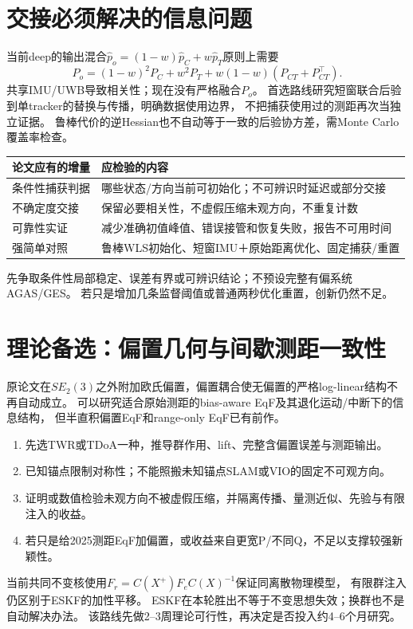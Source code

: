 \documentclass[11pt,a4paper]{ctexart}
\begin{document}
\clearpage
\section{交接必须解决的信息问题}
当前deep的输出混合$\hat p_o=(1-w)\hat p_C+w\hat p_T$原则上需要
\begin{equation}
P_o=(1-w)^2P_C+w^2P_T+w(1-w)(P_{CT}+P_{CT}^{\top}).
\end{equation}
共享IMU/UWB导致相关性；现在没有严格融合$P_o$。
首选路线研究短窗联合后验到单tracker的替换与传播，明确数据使用边界，
不把捕获使用过的测距再次当独立证据。
鲁棒代价的逆Hessian也不自动等于一致的后验协方差，需Monte Carlo覆盖率检查。

\begin{center}\small
\begin{tabularx}{\linewidth}{lX}
\toprule
论文应有的增量&应检验的内容\\\midrule
条件性捕获判据&哪些状态/方向当前可初始化；不可辨识时延迟或部分交接\\
不确定度交接&保留必要相关性，不虚假压缩未观方向，不重复计数\\
可靠性实证&减少准确初值峰值、错误接管和恢复失败，报告不可用时间\\
强简单对照&鲁棒WLS初始化、短窗IMU＋原始距离优化、固定捕获/重置\\\bottomrule
\end{tabularx}\end{center}
先争取条件性局部稳定、误差有界或可辨识结论；不预设完整有偏系统AGAS/GES。
若只是增加几条监督阈值或普通两秒优化重置，创新仍然不足。

\section{理论备选：偏置几何与间歇测距一致性}
原论文在$SE_2(3)$之外附加欧氏偏置，偏置耦合使无偏置的严格log-linear结构不再自动成立。
可以研究适合原始测距的bias-aware EqF及其退化运动/中断下的信息结构，
但半直积偏置EqF和range-only EqF已有前作。
\begin{enumerate}
\item 先选TWR或TDoA一种，推导群作用、lift、完整含偏置误差与测距输出。
\item 已知锚点限制对称性；不能照搬未知锚点SLAM或VIO的固定不可观方向。
\item 证明或数值检验未观方向不被虚假压缩，并隔离传播、量测近似、先验与有限注入的收益。
\item 若只是给2025测距EqF加偏置，或收益来自更宽P/不同Q，不足以支撑较强新颖性。
\end{enumerate}
当前共同不变核使用$F_r=C(X^+)F_eC(X)^{-1}$保证同离散物理模型，
有限群注入仍区别于ESKF的加性平移。
ESKF在本轮胜出不等于不变思想失效；换群也不是自动解决办法。
该路线先做2--3周理论可行性，再决定是否投入约4--6个月研究。
\end{document}
